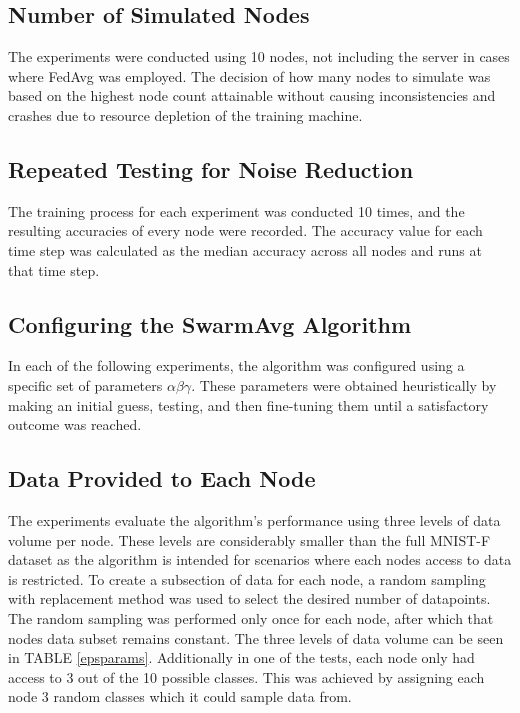\documentclass[letterpaper, 10 pt, conference]{ieeeconf}  %
\begin{document}
\subsection{Number of Simulated Nodes}
The experiments were conducted using 10 nodes, not including the server in cases where FedAvg was employed. The decision of how many nodes to simulate was based on the highest node count attainable without causing inconsistencies and crashes due to resource depletion of the training machine.

\subsection{Repeated Testing for Noise Reduction}
The training process for each experiment was conducted 10 times, and the resulting accuracies of every node were recorded. The accuracy value for each time step was calculated as the median accuracy across all nodes and runs at that time step.

\subsection{Configuring the SwarmAvg Algorithm}
In each of the following experiments, the algorithm was configured using a specific set of parameters $\alpha \beta \gamma$. These parameters were obtained heuristically by making an initial guess, testing, and then fine-tuning them until a satisfactory outcome was reached.

\subsection{Data Provided to Each Node}
The experiments evaluate the algorithm's performance using three levels of data volume per node. These levels are considerably smaller than the full MNIST-F dataset as the algorithm is intended for scenarios where each nodes access to data is restricted. To create a subsection of data for each node, a random sampling with replacement method was used to select the desired number of datapoints. The random sampling was performed only once for each node, after which that nodes data subset remains constant. The three levels of data volume can be seen in TABLE \ref{epsparams}. Additionally in one of the tests, each node only had access to 3 out of the 10 possible classes. This was achieved by assigning each node 3 random classes which it could sample data from.
\end{document}
